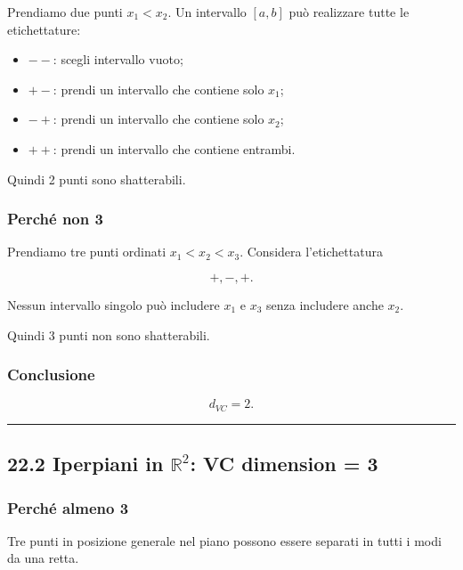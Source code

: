 \documentclass[
]{article}
\providecommand{\tightlist}{%
  \setlength{\itemsep}{0pt}\setlength{\parskip}{0pt}}
\begin{document}
Prendiamo due punti \(x_1<x_2\). Un intervallo \([a,b]\) può realizzare
tutte le etichettature:

\begin{itemize}
\tightlist
\item
  \(--\): scegli intervallo vuoto;
\item
  \(+-\): prendi un intervallo che contiene solo \(x_1\);
\item
  \(-+\): prendi un intervallo che contiene solo \(x_2\);
\item
  \(++\): prendi un intervallo che contiene entrambi.
\end{itemize}

Quindi 2 punti sono shatterabili.

\subsubsection{Perché non 3}\label{perchuxe9-non-3}

Prendiamo tre punti ordinati \(x_1<x_2<x_3\). Considera l'etichettatura

\[
+,-,+.
\]

Nessun intervallo singolo può includere \(x_1\) e \(x_3\) senza
includere anche \(x_2\).

Quindi 3 punti non sono shatterabili.

\subsubsection{Conclusione}\label{conclusione-11}

\[
d_{VC}=2.
\]

\begin{center}\rule{0.5\linewidth}{0.5pt}\end{center}

\subsection{\texorpdfstring{22.2 Iperpiani in \(\mathbb{R}^2\): VC
dimension =
3}{22.2 Iperpiani in \textbackslash mathbb\{R\}\^{}2: VC dimension = 3}}\label{iperpiani-in-mathbbr2-vc-dimension-3}

\subsubsection{Perché almeno 3}\label{perchuxe9-almeno-3}

Tre punti in posizione generale nel piano possono essere separati in
tutti i modi da una retta.
\end{document}
